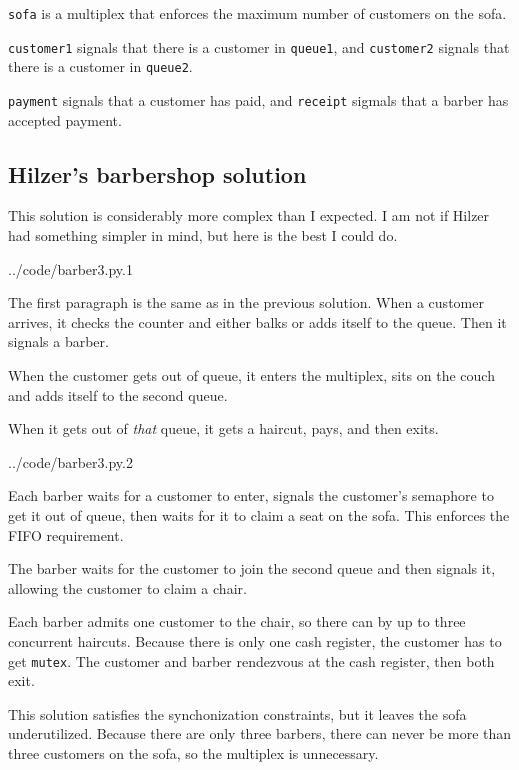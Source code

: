 \documentclass{book}
\newcommand{\clearemptydoublepage}{\newpage\cleardoublepage}
\begin{document}
{\tt sofa} is a multiplex that enforces the maximum number of customers
on the sofa.

{\tt customer1} signals that there is a customer in {\tt queue1}, and
{\tt customer2} signals that there is a customer in {\tt queue2}.

{\tt payment} signals that a customer has paid, and {\tt receipt}
sigmals that a barber has accepted payment.



\clearemptydoublepage
\subsection {Hilzer's barbershop solution}

This solution is considerably more complex than I expected.  I
am not if Hilzer had something simpler in mind, but here is the
best I could do.


{../code/barber3.py.1}

The first paragraph is the same as in the previous solution.  When
a customer arrives, it checks the counter and either balks or adds
itself to the queue.  Then it signals a barber.

When the customer gets out of queue, it enters the multiplex,
sits on the couch and adds itself to the second queue.

When it gets out of {\em that} queue, it gets a haircut, pays,
and then exits.


{../code/barber3.py.2}

Each barber waits for a customer to enter, signals the customer's
semaphore to get it out of queue, then waits for it to claim a seat
on the sofa.  This enforces the FIFO requirement.

The barber waits for the customer to join the second queue and then
signals it, allowing the customer to claim a chair.

Each barber admits one customer to the chair, so there can by up
to three concurrent haircuts.  Because there is only one cash
register, the customer has to get {\tt mutex}.  The customer
and barber rendezvous at the cash register, then both exit.

This solution satisfies the synchonization constraints, but it leaves
the sofa underutilized.  Because there are only three barbers, there
can never be more than three customers on the sofa, so the multiplex
is unnecessary.
\end{document}
